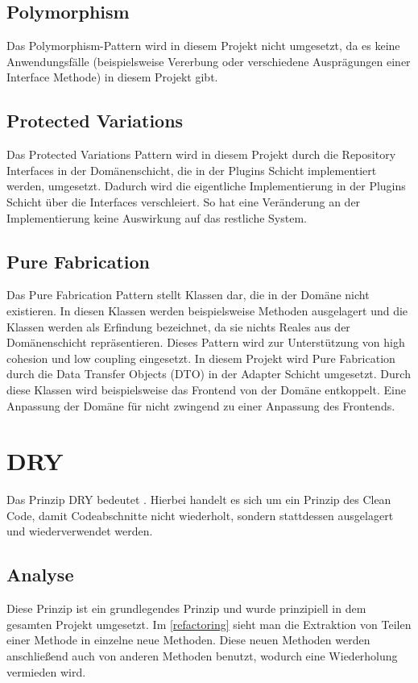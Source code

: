     \subsection{Polymorphism}
    Das Polymorphism-Pattern wird in diesem Projekt nicht umgesetzt, da es keine Anwendungsfälle (beispielsweise Vererbung oder verschiedene Ausprägungen einer Interface Methode) in diesem Projekt gibt.
    
    \subsection{Protected Variations}
    Das Protected Variations Pattern wird in diesem Projekt durch die Repository Interfaces in der Domänenschicht, die in der Plugins Schicht implementiert werden, umgesetzt. Dadurch wird die eigentliche Implementierung in der Plugins Schicht über die Interfaces verschleiert. So hat eine Veränderung an der Implementierung keine Auswirkung auf das restliche System.
    
    \subsection{Pure Fabrication}
    Das Pure Fabrication Pattern stellt Klassen dar, die in der Domäne nicht existieren. In diesen Klassen werden beispielsweise Methoden ausgelagert und die Klassen werden als Erfindung bezeichnet, da sie nichts Reales aus der Domänenschicht repräsentieren. Dieses Pattern wird zur Unterstützung von high cohesion und low coupling eingesetzt. In diesem Projekt wird Pure Fabrication durch die Data Transfer Objects (DTO) in der Adapter Schicht umgesetzt. Durch diese Klassen wird beispielsweise das Frontend von der Domäne entkoppelt. Eine Anpassung der Domäne für nicht zwingend zu einer Anpassung des Frontends.

\section{DRY}
Das Prinzip DRY bedeutet . Hierbei handelt es sich um ein Prinzip des Clean Code, damit Codeabschnitte nicht wiederholt, sondern stattdessen ausgelagert und wiederverwendet werden.

    \subsection{Analyse}
    Diese Prinzip ist ein grundlegendes Prinzip und wurde prinzipiell in dem gesamten Projekt umgesetzt. Im \cref{refactoring} sieht man die Extraktion von Teilen einer Methode in einzelne neue Methoden. Diese neuen Methoden werden anschließend auch von anderen Methoden benutzt, wodurch eine Wiederholung vermieden wird.
    
